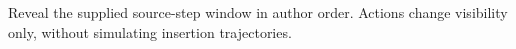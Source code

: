 Reveal the supplied source-step window in author order. Actions change visibility only, without simulating insertion trajectories.
